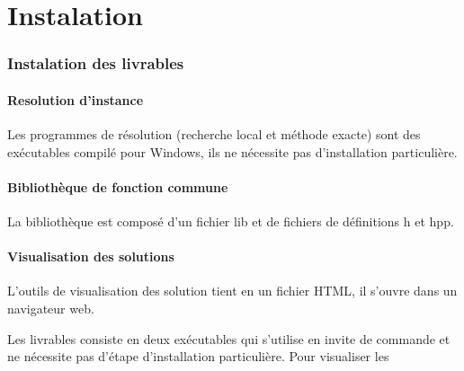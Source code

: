 \chapter{Instalation}

\subsection{Instalation des livrables}

\subsubsection{Resolution d'instance}
Les programmes de résolution (recherche local et méthode exacte) sont des exécutables compilé pour Windows,
ils ne nécessite pas d'installation particulière.

\subsubsection{Bibliothèque de fonction commune}
La bibliothèque est composé d'un fichier lib et de fichiers de définitions h et hpp.


\subsubsection{Visualisation des solutions}
L'outils de visualisation des solution tient en un fichier HTML,
il s'ouvre dans un navigateur web.

Les livrables consiste en deux exécutables qui s'utilise en invite de commande et ne nécessite pas d'étape d'installation particulière.
Pour visualiser les 